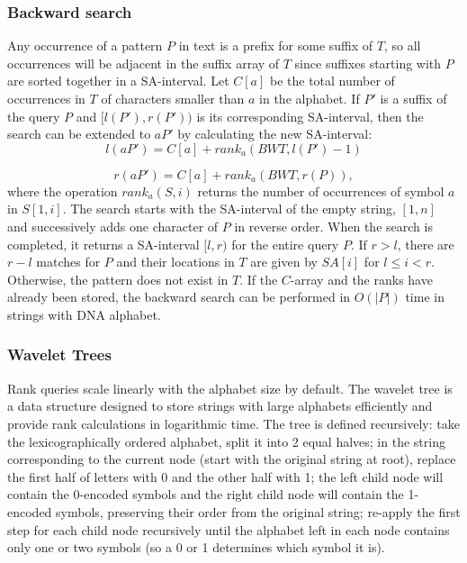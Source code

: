 \documentclass[runningheads,a4paper]{llncs}
\begin{document}
\subsubsection{Backward search}
Any occurrence of a pattern $P$ in text is a prefix for some suffix of $T$, so all occurrences will be adjacent in the suffix array of $T$ since suffixes starting with $P$ are sorted together in a SA-interval. Let $C[a]$ be the total number of occurrences in $T$ of characters smaller than $a$ in the alphabet. If $P'$ is a suffix of the query $P$ and $[l(P'),r(P'))$ is its corresponding SA-interval, then the search can be extended to $aP'$ by calculating the new SA-interval:
\newline
\begin{equation} 
l(aP')=C[a]+rank_{a}(BWT,l(P')-1)
\end{equation} 

\begin{equation} 
r(aP')=C[a]+rank_{a}(BWT,r(P)),
\end{equation}
where the operation $rank_a(S,i)$ returns the number of occurrences of symbol $a$ in $S[1,i]$. The search starts with the SA-interval of the empty string, $[1,n]$ and successively adds one character of $P$ in reverse order. When the search is completed, it returns a SA-interval $[l,r)$ for the entire query $P$. If $r > l$, there are $r-l$ matches for $P$ and their locations in $T$ are given by $SA[i]$ for $l \leq i < r$. Otherwise, the pattern does not exist in $T$. If the $C$-array and the ranks have already been stored, the backward search can be performed in $O(|P|)$ time in strings with DNA alphabet.
\subsubsection{Wavelet Trees}
Rank queries scale linearly with the alphabet size by default. The wavelet tree \cite{wt} is a data structure designed to store strings with large alphabets efficiently and provide rank calculations in logarithmic time. The tree is defined recursively: take the lexicographically ordered alphabet, split it into 2 equal halves; in the string corresponding to the current node (start with the original string at root), replace the first half of letters with 0 and the other half with 1; the left child node will contain the 0-encoded symbols and the right child node will contain the 1-encoded symbols, preserving their order from the original string; re-apply the first step for each child node recursively until the alphabet left in each node contains only one or two symbols (so a 0 or 1 determines which symbol it is).
\end{document}
